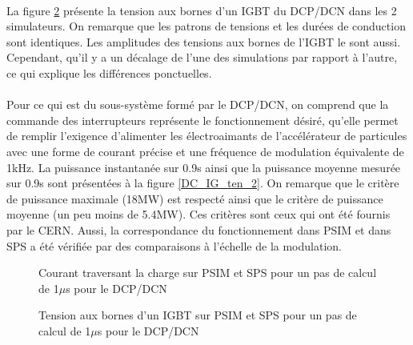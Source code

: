 \paragraph{} La figure \ref{DC_IG_ten_1} présente la tension aux bornes d'un IGBT du DCP/DCN dans les 2 simulateurs. On remarque que les patrons de tensions et les durées de conduction sont identiques. Les amplitudes des tensions aux bornes de l'IGBT le sont aussi. Cependant, qu'il y a un décalage de l'une des simulations par rapport à l'autre, ce qui explique les différences ponctuelles. 

\paragraph{}Pour ce qui est du sous-système formé par le DCP/DCN, on comprend que la commande des interrupteurs représente le fonctionnement désiré, qu'elle permet de remplir l'exigence d'alimenter les électroaimants de l'accélérateur de particules avec une forme de courant précise et une fréquence de modulation équivalente de 1kHz. La puissance instantanée sur 0.9s ainsi que la puissance moyenne mesurée sur 0.9s sont présentées à la figure \ref{DC_IG_ten_2}. On remarque que le critère de puissance maximale (18MW) est respecté ainsi que le critère de puissance moyenne (un peu moins de 5.4MW). Ces critères sont ceux qui ont été fournis par le CERN. Aussi, la correspondance du fonctionnement dans PSIM et dans SPS a été vérifiée par des comparaisons à l'échelle de la modulation. 

\begin{figure}[htb]
\centering
{}
\caption{Courant traversant la charge sur PSIM et SPS pour un pas de calcul de 1$\mu$s pour le DCP/DCN}
\label{DC_ch_cou_1}
\end{figure}

\begin{figure}[htb]
\centering
{}
\caption{Tension aux bornes d'un IGBT sur PSIM et SPS pour un pas de calcul de 1$\mu$s pour le DCP/DCN}
\label{DC_IG_ten_1}
\end{figure}


